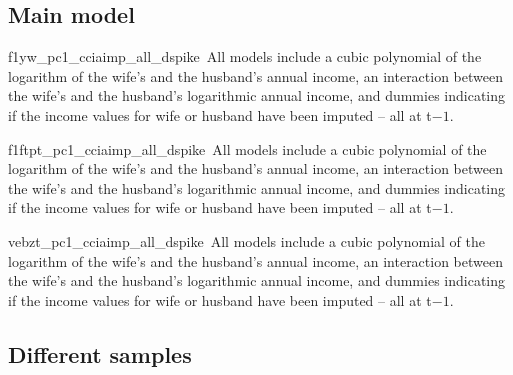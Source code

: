 \documentclass[a4paper,11pt]{scrartcl}
\begin{document}
\begin{appendix}
	\renewcommand{\samplenote}{}

	\renewcommand{\specnote}{}

	\newcommand{\xtfenoteB}{All models include dummies for age groups of 5 years for both spouses, dummy variables for the age of the youngest child in the household, the district level unemployment rate at the month of the interview, and dummy variables for the survey year -- all at t. Averaged over 25 simulation runs based on procedures described in the data section. Standard errors clustered on couple level in parentheses; *** p$<$0.001, ** p$<$0.01, * p$<$0.05, \dag\, p$<$0.1}

	\subsection{Main model}\label{mainspec}
	\setcounter{table}{0}
	\setcounter{figure}{0}

	\renewcommand{\specnote}{All models include a cubic polynomial of the logarithm of the wife's and the husband's annual income, an interaction between the wife's and the husband's logarithmic annual income, and dummies indicating if the income values for wife or husband have been imputed -- all at t$-1$.}


		{f1yw_pc1_cciaimp_all_dspike}%
		{\samplenote\,\specnote}

		{f1ftpt_pc1_cciaimp_all_dspike}%
		{\samplenote\,\specnote}

		{vebzt_pc1_cciaimp_all_dspike}%
		{\samplenote\,\specnote}


	\subsection{Different samples}
	\setcounter{table}{0}
	\setcounter{figure}{0}

	\renewcommand{\specnote}{All models include a cubic polynomial of the logarithm of the wife's and the husband's annual income, an interaction between the wife's and the husband's annual log income, and the share of imputed income values for both wife and husband -- all at t$-1$.}




\end{appendix}
\end{document}
